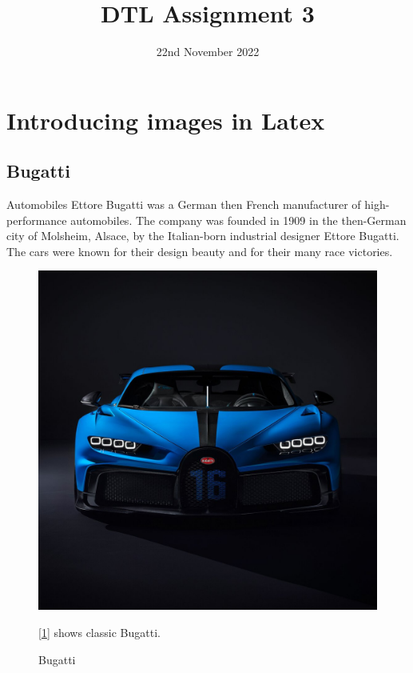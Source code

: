\documentclass{article}
\title{DTL Assignment 3}
\date{22nd November 2022}
\begin{document}
\maketitle
\clearpage
{}
\tableofcontents
\clearpage
\section{Introducing images in Latex}
\subsection{Bugatti}
Automobiles Ettore Bugatti was a German then French manufacturer of high-performance automobiles. The company was founded in 1909 in the then-German city of Molsheim, Alsace, by the Italian-born industrial designer Ettore Bugatti. The cars were known for their design beauty and for their many race victories.\\

\begin{figure}[h]
\includegraphics[scale=0.25]{Bugati.jpg}
\caption{Bugatti}
\label{fig : Bugatti}
[\ref{fig : Bugatti}] shows classic Bugatti.\\
\end{figure}
\clearpage
\end{document}
